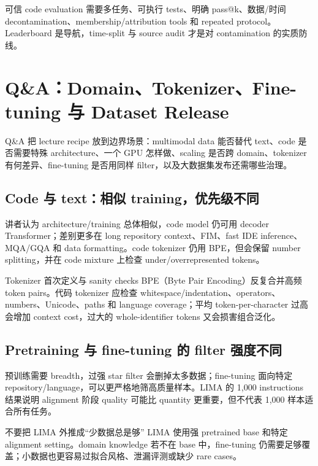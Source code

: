 \documentclass[a4paper]{article}
\begin{document}
可信 code evaluation 需要多任务、可执行 tests、明确 pass@k、数据/时间 decontamination、membership/attribution tools 和 repeated protocol。Leaderboard 是导航，time-split 与 source audit 才是对 contamination 的实质防线。

\section{Q\&A：Domain、Tokenizer、Fine-tuning 与 Dataset Release}

Q\&A 把 lecture recipe 放到边界场景：multimodal data 能否替代 text、code 是否需要特殊 architecture、一个 GPU 怎样做、scaling 是否跨 domain、tokenizer 有何差异、fine-tuning 是否用同样 filter，以及大数据集发布还需哪些治理。

\subsection{Code 与 text：相似 training，优先级不同}

讲者认为 architecture/training 总体相似，code model 仍可用 decoder Transformer；差别更多在 long repository context、FIM、fast IDE inference、MQA/GQA 和 data formatting。code tokenizer 仍用 BPE，但会保留 number splitting，并在 code mixture 上检查 under/overrepresented tokens。

\begin{knowledgebox}{Tokenizer 首次定义与 sanity checks}
BPE（Byte Pair Encoding）反复合并高频 token pairs。代码 tokenizer 应检查 whitespace/indentation、operators、numbers、Unicode、paths 和 language coverage；平均 token-per-character 过高会增加 context cost，过大的 whole-identifier tokens 又会损害组合泛化。
\end{knowledgebox}


\subsection{Pretraining 与 fine-tuning 的 filter 强度不同}

预训练需要 breadth，过强 star filter 会删掉太多数据；fine-tuning 面向特定 repository/language，可以更严格地筛高质量样本。LIMA 的 1,000 instructions 结果说明 alignment 阶段 quality 可能比 quantity 更重要，但不代表 1,000 样本适合所有任务。

\begin{warningbox}{不要把 LIMA 外推成“少数据总是够”}
LIMA 使用强 pretrained base 和特定 alignment setting。domain knowledge 若不在 base 中，fine-tuning 仍需要足够覆盖；小数据也更容易过拟合风格、泄漏评测或缺少 rare cases。
\end{warningbox}
\end{document}
